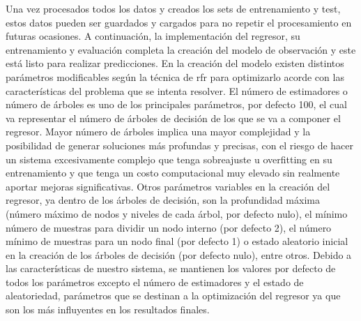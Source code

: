\par Una vez procesados todos los datos y creados los sets de entrenamiento y test, estos datos pueden ser guardados y cargados para no repetir el procesamiento en futuras ocasiones. A continuación, la implementación del regresor, su entrenamiento y evaluación completa la creación del modelo de observación y este está listo para realizar predicciones. En la creación del modelo existen distintos parámetros modificables según la técnica de \gls{rfr} para optimizarlo acorde con las características del problema que se intenta resolver. El número de estimadores o número de árboles es uno de los principales parámetros, por defecto 100, el cual va representar el número de árboles de decisión de los que se va a componer el regresor. Mayor número de árboles implica una mayor complejidad y la posibilidad de generar soluciones más profundas y precisas, con el riesgo de hacer un sistema excesivamente complejo que tenga sobreajuste u overfitting en su entrenamiento y que tenga un costo computacional muy elevado sin realmente aportar mejoras significativas. Otros parámetros variables en la creación del regresor, ya dentro de los árboles de decisión, son la profundidad máxima (número máximo de nodos y niveles de cada árbol, por defecto nulo), el mínimo número de muestras para dividir un nodo interno (por defecto 2), el número mínimo de muestras para un nodo final (por defecto 1) o estado aleatorio inicial en la creación de los árboles de decisión (por defecto nulo), entre otros. Debido a las características de nuestro sistema, se mantienen los valores por defecto de todos los parámetros excepto el número de estimadores y el estado de aleatoriedad, parámetros que se destinan a la optimización del regresor ya que son los más influyentes en los resultados finales. 